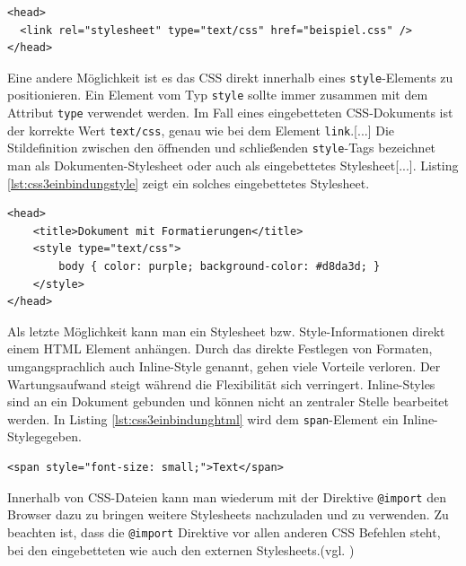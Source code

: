 \vspace{1em}
\begin{lstlisting}[language=HTML5, caption=Stylesheet Einbindung über \texttt{link}-Element, label=lst:css3einbindunglink]
<head>
  <link rel="stylesheet" type="text/css" href="beispiel.css" />
</head>
\end{lstlisting}

Eine andere Möglichkeit ist es das CSS direkt innerhalb eines \texttt{style}-Elements zu positionieren. Ein Element vom Typ \glqq \texttt{style} sollte immer zusammen mit dem Attribut \texttt{type} verwendet werden. Im Fall eines eingebetteten CSS-Dokuments ist der korrekte Wert \glqq \texttt{text/css}\grqq, genau wie bei dem Element \texttt{link}.[...] Die Stildefinition zwischen den öffnenden und schließenden \texttt{style}-Tags bezeichnet man als Dokumenten-Stylesheet oder auch als eingebettetes Stylesheet[...].\grqq{}\cite[S.19]{MeyeCasc2005} Listing \ref{lst:css3einbindungstyle} zeigt ein solches eingebettetes Stylesheet.

\vspace{1em}
\begin{lstlisting}[language=HTML5, caption=Stylesheet Einbindung über \texttt{style}-Element, label=lst:css3einbindungstyle]
<head>
	<title>Dokument mit Formatierungen</title>
	<style type="text/css">
		body { color: purple; background-color: #d8da3d; }
	</style>
</head>
\end{lstlisting}
	
Als letzte Möglichkeit kann man ein Stylesheet bzw. Style-Informationen direkt einem HTML Element anhängen. \glqq Durch das direkte Festlegen von Formaten, umgangsprachlich auch \glqq Inline-Style\grqq{} genannt, gehen viele Vorteile verloren. Der Wartungsaufwand steigt während die Flexibilität sich verringert. Inline-Styles sind an ein Dokument gebunden und können nicht an zentraler Stelle bearbeitet werden.\grqq{}\cite{SelfHtml20144} In Listing \ref{lst:css3einbindunghtml} wird dem \texttt{span}-Element ein \glqq Inline-Style\grqq gegeben.

\vspace{1em}
\begin{lstlisting}[language=HTML5, caption=Stylesheet Einbindung in \texttt{html}-Element, label=lst:css3einbindunghtml]
<span style="font-size: small;">Text</span>
\end{lstlisting}
	
Innerhalb von CSS-Dateien kann man wiederum mit der Direktive \texttt{@import} den Browser dazu zu bringen weitere Stylesheets nachzuladen und zu verwenden. Zu beachten ist, dass die \texttt{@import} Direktive vor allen anderen CSS Befehlen steht, bei den eingebetteten wie auch den externen Stylesheets.(vgl. \cite[S.20]{MeyeCasc2005})

